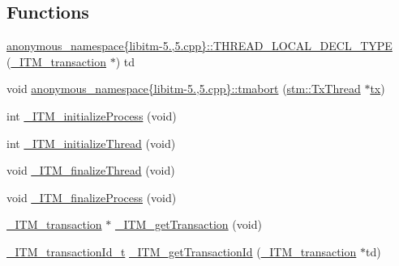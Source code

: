 \subsection*{Functions}
\begin{DoxyCompactItemize}
\item 
\hyperlink{namespaceanonymous__namespace_02libitm-5_81_005_8cpp_03_ace8c647e409f1fb27af6e0a3df63100c}{anonymous\-\_\-namespace\{libitm-\/5.,5.\-cpp\}\-::\-T\-H\-R\-E\-A\-D\-\_\-\-L\-O\-C\-A\-L\-\_\-\-D\-E\-C\-L\-\_\-\-T\-Y\-P\-E} (\hyperlink{libitm_8h_a65d3a93d285fdbde408558d6b431abc8}{\-\_\-\-I\-T\-M\-\_\-transaction} $\ast$) td
\item 
void \hyperlink{namespaceanonymous__namespace_02libitm-5_81_005_8cpp_03_a4c66a5e4427961d821f3a610417cbf56}{anonymous\-\_\-namespace\{libitm-\/5.,5.\-cpp\}\-::tmabort} (\hyperlink{structstm_1_1TxThread}{stm\-::\-Tx\-Thread} $\ast$\hyperlink{stmskip_8cc_a0f1c58699b83ce5a08bd9ee859250d72}{tx})
\item 
int \hyperlink{libitm-5_81_005_8cpp_ae97451d0a7481e2ad0e2b0c4196d5117}{\-\_\-\-I\-T\-M\-\_\-initialize\-Process} (void)
\item 
int \hyperlink{libitm-5_81_005_8cpp_a5cde4a3f0f8e98db7d17e4a6ed3859ca}{\-\_\-\-I\-T\-M\-\_\-initialize\-Thread} (void)
\item 
void \hyperlink{libitm-5_81_005_8cpp_a058da6dda5a61ad3ab82496220e332ed}{\-\_\-\-I\-T\-M\-\_\-finalize\-Thread} (void)
\item 
void \hyperlink{libitm-5_81_005_8cpp_acc2f560865f2ca96f42869ff81467f71}{\-\_\-\-I\-T\-M\-\_\-finalize\-Process} (void)
\item 
\hyperlink{libitm_8h_a65d3a93d285fdbde408558d6b431abc8}{\-\_\-\-I\-T\-M\-\_\-transaction} $\ast$ \hyperlink{libitm-5_81_005_8cpp_ae4d78d99d8baec2e9b548b865e83a893}{\-\_\-\-I\-T\-M\-\_\-get\-Transaction} (void)
\item 
\hyperlink{libitm_8h_a560abc8cf0e1499368b0cc014ee8bd60}{\-\_\-\-I\-T\-M\-\_\-transaction\-Id\-\_\-t} \hyperlink{libitm-5_81_005_8cpp_a7a9646bcb260015bc8136fc5decdaa26}{\-\_\-\-I\-T\-M\-\_\-get\-Transaction\-Id} (\hyperlink{libitm_8h_a65d3a93d285fdbde408558d6b431abc8}{\-\_\-\-I\-T\-M\-\_\-transaction} $\ast$td)
\end{DoxyCompactItemize}


